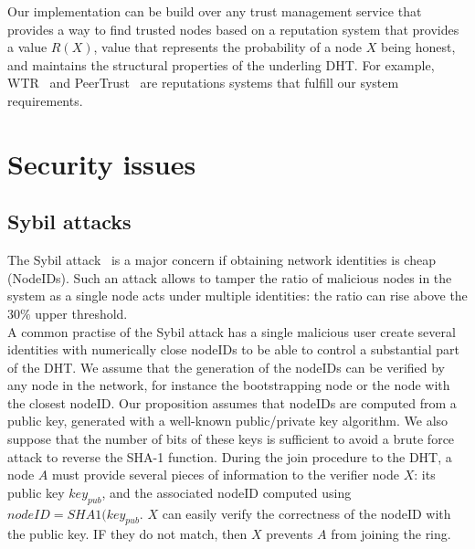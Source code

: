 Our implementation can be build over any trust management service that
provides a way to find trusted nodes based on a reputation system
that provides a value $R(X)$, value that represents the probability of a node
$X$ being honest, and maintains the structural properties of the underling
DHT. For example, WTR~\cite{bonnaire2009wtr} and
PeerTrust~\cite{xiong2004peertrust} are reputations systems that fulfill our
system requirements.



\section{Security issues}

\subsection{Sybil attacks}
\label{sec:sybil_attacks}

The Sybil attack~\cite{the_sybil_attack} is a major concern if obtaining
network identities is cheap (NodeIDs). Such an attack allows to tamper the ratio of
malicious nodes in the system as a single node acts under multiple identities:
the ratio can rise above the $30\%$ upper threshold. \\

A common practise of the Sybil attack has a single malicious user create
several identities with numerically close nodeIDs to be able to control a
substantial part of the DHT. We assume that the generation of the nodeIDs can
be verified by any node in the network, for instance the bootstrapping node or
the node with the closest nodeID. Our proposition assumes that nodeIDs are
computed from a public key, generated with a well-known public/private key
algorithm. We also suppose that the number of bits of these keys is sufficient
to avoid a brute force attack to reverse the SHA-1 function. During the join
procedure to the DHT, a node $A$ must provide several pieces of information to
the verifier node $X$: its public key $key_{pub}$, and the associated nodeID computed using
$nodeID = SHA1(key_{pub}$. $X$ can easily verify the correctness of the nodeID
with the public key. IF they do not match, then $X$ prevents $A$ from joining
the ring.\\

